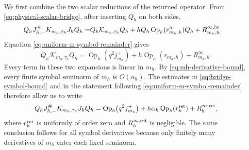 \documentclass[11pt,reqno]{amsart}
\newcommand{\Op}{\operatorname{Op}}
\numberwithin{equation}{section}
\begin{document}
We first combine the two scalar reductions of the returned operator. From \eqref{eq:physical-scalar-bridge}, after inserting $Q_h$ on both sides,
\begin{equation*}
 \begin{aligned}
 Q_hJ_{h,-}^{\#}K_{m_h,\tau_h}J_hQ_h
 =&Q_h\mathcal K_{m_h,\tau_h}Q_h
 +hQ_h\Op_h(r_{m_h,h}^{\rm br})Q_h
 +R_{m_h,h}^{\infty,\rm br}.
 \end{aligned}
\end{equation*}
Equation \eqref{eq:uniform-m-symbol-remainder} gives
\begin{equation*}
 Q_h\mathcal K_{m_h,\tau_h}Q_h = \Op_h(q^2j_{m_h}^+)+h\Op_h(r_{m_h,h}) +R_{m_h,h}^{\infty}.
\end{equation*}
Every term in these two expansions is linear in $m_h$. By \eqref{eq:mh-derivative-bound}, every finite symbol seminorm of $m_h$ is $O(\alpha_h)$. The estimates in \eqref{eq:bridge-symbol-bound} and in the statement following \eqref{eq:uniform-m-symbol-remainder} therefore allow us to write
\begin{equation}\label{eq:selected-returned-symbol}
 Q_hJ_{h,-}^{\#}K_{m_h,\tau_h}J_hQ_h = \Op_h\bigl(q^2j_{m_h}^+\bigr)+h\alpha_h\Op_h(r_h^{\rm ret})+R_h^{\infty,\rm ret},
\end{equation}
where $r_h^{\rm ret}$ is uniformly of order zero and $R_h^{\infty,\rm ret}$ is negligible. The same conclusion follows for all symbol derivatives because only finitely many derivatives of $m_h$ enter each fixed seminorm.
\end{document}

